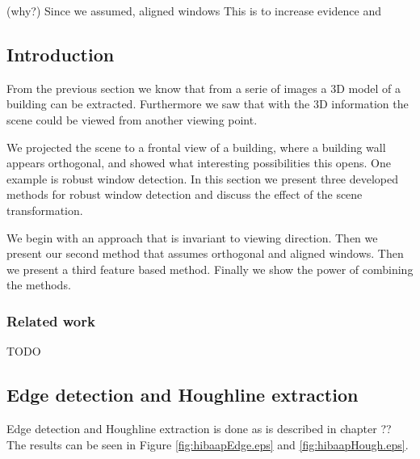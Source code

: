     


	(why?)
	Since we assumed, aligned windows
	This is to increase evidence and

	 






\label{chap:windowDetection}
\subsection{Introduction}
From the previous section we know that from a serie of images a 3D model of a
building can be extracted. Furthermore we saw that with the 3D information the
scene could be viewed from another viewing point. 

We projected the scene to a frontal view of a building, where a building wall appears
orthogonal, and showed what interesting possibilities this opens.
One example is robust window detection.
In this section we present three developed methods for robust window detection
and discuss the effect of the scene transformation.

We begin with an approach that is invariant to viewing direction.  Then we
present our second method that assumes orthogonal and aligned windows.  Then we
present a third feature based method.  Finally we show the power of combining
the methods.



\subsubsection{Related work}
TODO

\subsection{Edge detection and Houghline extraction} 
Edge detection and Houghline extraction is done as is described in chapter ??
The results can be seen in Figure \ref{fig:hibaapEdge.eps} and
\ref{fig:hibaapHough.eps}.

